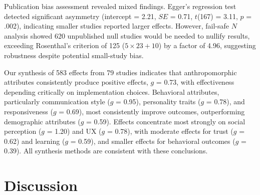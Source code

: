 \documentclass[manuscript,anonymous,sigconf]{acmart}
\begin{document}
Publication bias assessment revealed mixed findings. Egger's regression test detected significant asymmetry (intercept = 2.21, $SE$ = 0.71, $t$(167) = 3.11, $p$ = .002), indicating smaller studies reported larger effects. However, fail-safe $N$ analysis showed 620 unpublished null studies would be needed to nullify results, exceeding Rosenthal's criterion \cite{rosenthal1979file} of 125 ($5\times23+10$) by a factor of 4.96, suggesting robustness despite potential small-study bias.

Our synthesis of 583 effects from 79 studies indicates that anthropomorphic attributes consistently produce positive effects, $g$ = 0.73, with effectiveness depending critically on implementation choices. Behavioral attributes, particularly communication style ($g$ = 0.95), personality traits ($g$ = 0.78), and responsiveness ($g$ = 0.69), most consistently improve outcomes, outperforming demographic attributes ($g$ = 0.59). Effects concentrate most strongly on social perception ($g$ = 1.20) and UX ($g$ = 0.78), with moderate effects for trust ($g$ = 0.62) and learning ($g$ = 0.59), and smaller effects for behavioral outcomes ($g$ = 0.39). All synthesis methods are consistent with these conclusions. %

\section{Discussion}


\end{document}
